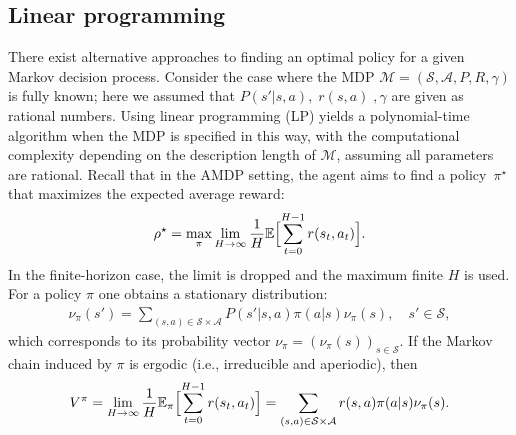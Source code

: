 \documentclass{article}
\numberwithin{equation}{section}
\newcommand{\cM}{\mathcal{M}}
\newcommand{\eqsp}{\;}
\begin{document}
\subsection{Linear programming}\label{subsec:lp}

There exist alternative approaches to finding an optimal policy for a given Markov decision process. Consider the case where the MDP $\cM = (\mathcal{S}, \mathcal{A}, P, R, \gamma)$ is fully known; here we assumed that $P(s'|s,a),\;r(s,a)\eqsp,\gamma$ are given as rational numbers. 
Using linear programming (LP) yields a polynomial-time algorithm when the MDP is specified in this way, with the computational complexity depending on the description length of $\cM$, assuming all parameters are rational. Recall that in the AMDP setting, the agent aims to find a policy~$\pi^\star$ that maximizes the expected average reward:
\begin{gather*}
    \rho^{\star}= \max_{\pi} \lim_{H\rightarrow \infty} \frac{1}{H}\mathbb{E} \Bigl[ \sum_{t=0}^{H-1}r(s_t,a_t) \Bigr ].
\end{gather*}
In the finite-horizon case, the limit is dropped and the maximum finite $H$ is used. For a policy $\pi$ one obtains a stationary distribution:
\begin{gather*}
    \nu_{\pi}(s')=\sum\limits_{(s,a)\in\mathcal{S}\times\mathcal{A}}P(s'|s, a)\pi(a|s)\nu_{\pi}(s),\quad s'\in\mathcal{S},
\end{gather*}
which corresponds to its probability vector $\nu_{\pi} = \left(\nu_{\pi}(s)\right)_{s\in\mathcal{S}}$. If the Markov chain induced by $\pi$ is ergodic (i.e., irreducible and aperiodic),  then
\begin{gather*}
    V^\pi=\lim_{H\to\infty}
\frac1H
\mathbb E_\pi
\Bigl[\sum_{t=0}^{H-1} r(s_t,a_t)\Bigr]=\sum\limits_{(s,a)\in\mathcal{S}\times\mathcal{A}}r(s,a)\pi(a|s)\nu_\pi(s).
\end{gather*}
\end{document}
